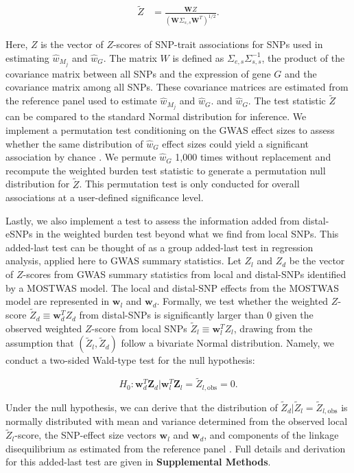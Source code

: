 \begin{equation}\label{wbtest}
\begin{split}
\tilde{Z} & = \frac{\mathbf{W}Z}{(\mathbf{W}\Sigma_{s,s}\mathbf{W}^T)^{1/2}}.
\end{split}
\end{equation}

Here, $Z$ is the vector of $Z$-scores of SNP-trait
associations for SNPs used in estimating $\hat{w}_{M_j}$
and $\hat{w}_G$. The matrix $W$ is defined as 
$\Sigma_{e,s}\Sigma_{s,s}^{-1}$, the product of
the covariance matrix between all SNPs
and the expression of gene $G$ and the covariance
matrix among all SNPs. These covariance matrices
are estimated from the reference panel used to estimate
$\hat{w}_{M_j}$
and $\hat{w}_G$.
and $\hat{w}_G$. The test statistic $\tilde{Z}$
can be compared to the standard Normal distribution
for inference.
We implement a permutation
test conditioning
on the GWAS effect sizes to assess
whether the same distribution
of $\hat{w}_G$ effect
sizes could yield a significant
association by chance \cite{Gusev2016}. 
We
permute $\hat{w}_G$ 1,000
times without replacement
and recompute the weighted
burden test statistic
to generate a permutation
null distribution for $\tilde{Z}$.
This permutation test
is only conducted for
overall associations
at a user-defined significance
level. 

Lastly, we also 
implement a test to assess
the information added from distal-eSNPs
in the weighted burden test beyond
what we find from local SNPs.
This added-last test
can be thought of as
a group added-last test
in regression analysis, applied
here to GWAS summary statistics.
Let $Z_l$ and 
$Z_d$  be the vector of $Z$-scores
from GWAS summary statistics
from
local and distal-SNPs identified
by a MOSTWAS model. 
The local
and distal-SNP effects
from the MOSTWAS model are represented
in $\mathbf{w}_l$ and 
$\mathbf{w}_d$.
Formally, we test
whether the weighted $Z$-score $\tilde{Z}_d \equiv \mathbf{w}_d^TZ_d$
from distal-SNPs is significantly
larger than 0 given the observed
weighted $Z$-score from local SNPs $\tilde{Z}_{l} \equiv \mathbf{w}_l^TZ_l$,
drawing from the assumption that
$(\tilde{Z}_l,\tilde{Z}_d)$
follow a bivariate Normal distribution. Namely, we
conduct a two-sided
Wald-type test for the null
hypothesis:

$$H_0: \mathbf{w}_d^T\mathbf{Z}_d | \mathbf{w}_l^T\mathbf{Z}_l = \tilde{Z}_{l,\text{obs}} = 0.$$

Under the null hypothesis,
we can derive that the
distribution of $\tilde{Z}_d|\tilde{Z}_l = \tilde{Z}_{l,\text{obs}}$
is normally distributed
with mean and variance
determined from the observed
local $\tilde{Z}_l$-score,
the SNP-effect size
vectors $\mathbf{w}_l$
and $\mathbf{w}_d$,
and components of the linkage
disequilibrium as estimated
from the reference panel \cite{Pasaniuc2014FastEnrichment}.
Full details and derivation
for this added-last test
are given in \textbf{Supplemental
Methods}.

